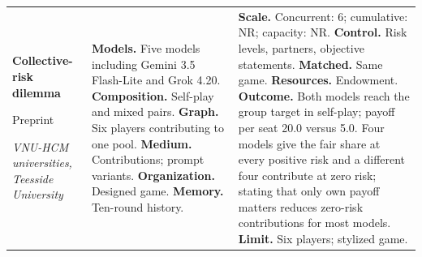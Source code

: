 \begin{longtable}{@{}>{\raggedright\arraybackslash}p{}>{\raggedright\arraybackslash}p{}>{\raggedright\arraybackslash}p{}@{}}
\textbf{Collective-risk dilemma}\par \citep{cooperation-without-adaptation}\par Preprint\par\emph{VNU-HCM universities, Teesside University} & \textbf{Models.} Five models including Gemini 3.5 Flash-Lite and Grok 4.20. \textbf{Composition.} Self-play and mixed pairs. \textbf{Graph.} Six players contributing to one pool. \textbf{Medium.} Contributions; prompt variants. \textbf{Organization.} Designed game. \textbf{Memory.} Ten-round history. & \textbf{Scale.} Concurrent: 6; cumulative: NR; capacity: NR. \textbf{Control.} Risk levels, partners, objective statements. \textbf{Matched.} Same game. \textbf{Resources.} Endowment. \textbf{Outcome.} Both models reach the group target in self-play; payoff per seat 20.0 versus 5.0. Four models give the fair share at every positive risk and a different four contribute at zero risk; stating that only own payoff matters reduces zero-risk contributions for most models. \textbf{Limit.} Six players; stylized game. \\
\end{longtable}
\endgroup

